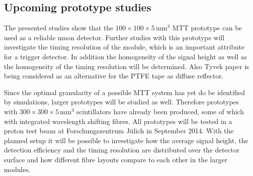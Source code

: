 \newpage
\subsection{Upcoming prototype studies}
\label{section:simon/outlook}
The presented studies show that the $100 \times 100 \times 5 \,\text{mm}^3$ MTT prototype can be used as a reliable muon detector. Further studies with this prototype will investigate the timing resolution of the module, which is an important attribute for a trigger detector. In addition the homogeneity of the signal height as well as the homogeneity of the timing resolution will be determined. Also Tyvek paper is being considered as an alternative for the PTFE tape as diffuse reflector.

Since the optimal granularity of a possible MTT system has yet do be identified by simulations, larger prototypes will be studied as well. Therefore prototypes with $300 \times 300 \times 5 \,\text{mm}^3$ scintillators have already been produced, some of which with integrated wavelength shifting fibres. All prototypes will be tested in a proton test beam at Forschungszentrum J\"ulich in September 2014. With the planned setup it will be possible to investigate how the average signal height, the detection efficiency and the timing resolution are distributed over the detector surface and how different fibre layouts compare to each other in the larger modules.
